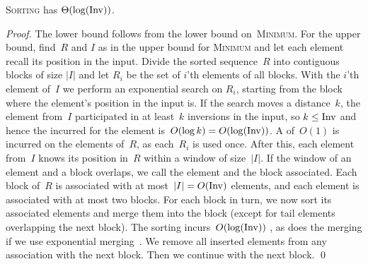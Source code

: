 \begin{theorem}
\textsc{Sorting} has \frag $\Theta(\log (\mathrm{Inv}))$.
\end{theorem}
\begin{proof}
The lower bound follows from the lower bound on~\textsc{Minimum}.
For the upper bound, find~$R$ and $I$ as in the upper bound for
\textsc{Minimum} and let each element recall its position in the
input. Divide the sorted sequence~$R$ into contiguous blocks of size
$|I|$ and let $R_i$ be the set of $i$'th elements of all blocks.
With the $i$'th element of~$I$ we perform an exponential search on
$R_i$, starting from the block where the element's position in the
input is. If the search moves a distance~$k$, the element from~$I$
participated in at least~$k$ inversions in the input, so
$k \le \mathrm{Inv}$ and hence the incurred \frag for the element
is~$O(\log k) = O(\log(\mathrm{Inv}))$. A \frag of~$O(1)$ is incurred on the
elements of~$R$, as each~$R_i$ is used once. After this, each
element from~$I$ knows its position in~$R$ within a window of
size~$|I|$. If the window of an element and a block overlaps, we
call the element and the block associated. Each block of~$R$ is
associated with at most~$|I| = O(\mathrm{Inv})$ elements, and each element
is associated with at most two blocks. For each block in turn, we
now sort its associated elements and merge them into the block
(except for tail elements overlapping the next block). The sorting
incurs~$O(\log(\mathrm{Inv}))$ \frag, as does the merging if we use
exponential merging~\cite{afshani:fragile-ESA19}. We remove all
inserted elements from any association with the next block. Then we
continue with the next block. \qed
\end{proof}
